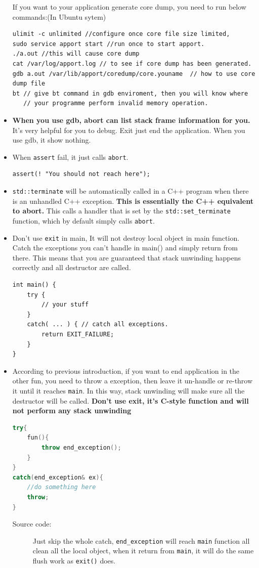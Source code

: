 \documentclass[a4paper,11pt,twoside]{book}
\begin{document}
\begin{itemize}
If you want to your application generate core dump, you need to run below commands:(In Ubuntu sytem)
\begin{lstlisting}[]
ulimit -c unlimited //configure once core file size limited,
sudo service apport start //run once to start apport.
./a.out //this will cause core dump
cat /var/log/apport.log // to see if core dump has been generated. 
gdb a.out /var/lib/apport/coredump/core.youname  // how to use core dump file
bt // give bt command in gdb enviroment, then you will know where 
   // your programme perform invalid memory operation.
\end{lstlisting}
	
	\item \textbf{When you use gdb, abort can list stack frame information for you.} It's very helpful for you to debug.  Exit just end the application. When you use gdb, it show nothing.
	
	\item When \texttt{assert} fail, it just calls \texttt{abort}. 
\begin{lstlisting}[numbers=none]
assert(! "You should not reach here");
\end{lstlisting}
	
	\item \texttt{std::terminate} will be automatically called in a C++ program when there is an unhandled C++ exception. \textbf{This is essentially the C++ equivalent to abort.} This calls a handler that is set by the \texttt{std::set\_terminate} function, which by default simply calls \texttt{abort}.
	
	\item Don't use \texttt{exit} in main, It will not destroy local object in main function. Catch the exceptions you can't handle in main() and simply return from there. This means that you are guaranteed that stack unwinding happens correctly and all destructor are called.
\begin{lstlisting}[numbers=none]
int main() {
	try {
		// your stuff
	}
	catch( ... ) { // catch all exceptions.
		return EXIT_FAILURE;
	}
}
\end{lstlisting}
	
	\item According to previous introduction, if you want to end application in the other fun, you need to throw a exception, then leave it un-handle or re-throw it until it reaches \texttt{main}. In this way, stack unwinding will make sure all the destructor will be called. \textbf{Don't use exit, it's C-style function and will not perform any stack unwinding}
\begin{lstlisting}[frame=single, language=c++]
try{
	fun(){
		throw end_exception();
	}
}
catch(end_exception& ex){
	//do something here
	throw;
}
\end{lstlisting}
\begin{description}
	\item[Source code:] Just skip the whole catch, \texttt{end\_exception} will reach \texttt{main} function all clean all the local object, when it return from \texttt{main}, it will do the same flush work as \texttt{exit()} does.
\end{description}


\end{itemize}
\end{document}

